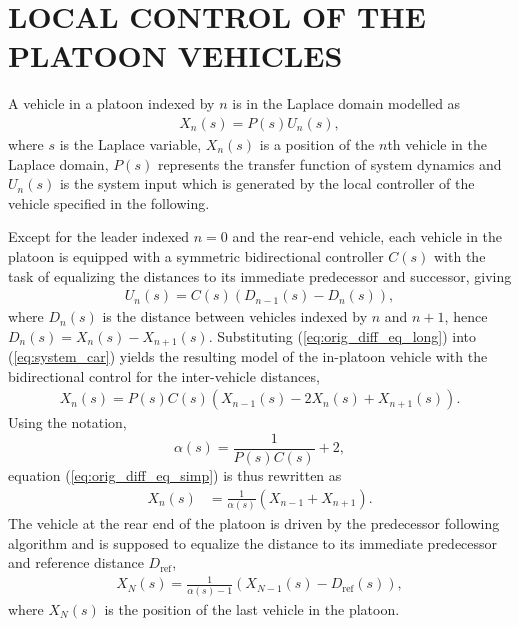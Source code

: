 \documentclass[final,5p,times,twocolumn]{elsarticle}
\begin{document}
\section{LOCAL CONTROL OF THE PLATOON VEHICLES}
A vehicle in a platoon indexed by $n$ is in the Laplace domain modelled as
\begin{align}
  X_{n}(s) = P(s) U_n(s),
  \label{eq:system_car}
\end{align}
where $s$ is the Laplace variable, $X_n(s)$ is a position of the $n$th vehicle in the Laplace domain, $P(s)$ represents the transfer function of system dynamics and $U_n(s)$ is the system input which is generated by the local controller of the vehicle specified in the following.

Except for the leader indexed $n=0$ and the rear-end vehicle, each vehicle in the platoon is equipped with a symmetric bidirectional controller $C(s)$ with the task of equalizing the distances to its immediate predecessor and successor, giving
\begin{align}
U_n(s) = C(s)(D_{n-1}(s) - D_{n}(s)),
\label{eq:orig_diff_eq_long}
\end{align}
where $D_n(s)$ is the distance between vehicles indexed by $n$ and $n+1$, hence $D_n(s)= X_{n}(s) - X_{n+1}(s)$. Substituting (\ref{eq:orig_diff_eq_long}) into (\ref{eq:system_car}) yields the resulting model of the in-platoon vehicle with the bidirectional control for the inter-vehicle distances,
\begin{align}
X_{n}(s) = P(s)C(s) (X_{n-1}(s)-2X_{n}(s)+X_{n+1}(s)).
\label{eq:orig_diff_eq_simp}
\end{align}
Using the notation,
\begin{equation}
  \alpha(s) = \frac{1}{P(s)C(s)}+2,
  \label{eq:alpha_generalized}
\end{equation}
equation (\ref{eq:orig_diff_eq_simp}) is thus rewritten as
\begin{align}
  X_{n}(s) &= \frac{1}{\alpha(s)}(X_{n-1}+X_{n+1}).
  \label{eq:bidir_sys_laplace}
\end{align}
The vehicle at the rear end of the platoon is driven by the predecessor following algorithm and is supposed to equalize the distance to its immediate predecessor and reference distance $D_{\text{ref}}$,
\begin{align}
  X_{N}(s) = \frac{1}{\alpha(s)-1}(X_{N-1}(s)-D_{\text{ref}}(s)),
  \label{eq:last_sys_laplace}
\end{align}
where $X_{N}(s)$ is the position of the last vehicle in the platoon.
\end{document}
